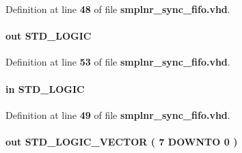 Definition at line {\bf 48} of file {\bf smplnr\+\_\+sync\+\_\+fifo.\+vhd}.

\paragraph[{rdempty}]{ {\bfseries \textcolor{keywordflow}{out}\textcolor{vhdlchar}{ }} {\bfseries \textcolor{comment}{S\+T\+D\+\_\+\+L\+O\+G\+IC}\textcolor{vhdlchar}{ }} \hspace{0.3cm}{\ttfamily [Port]}}\label{classsmplnr__sync__fifo_afc6d6b8085df7af6f9c5d7dc39b1157c}


Definition at line {\bf 53} of file {\bf smplnr\+\_\+sync\+\_\+fifo.\+vhd}.

\paragraph[{rdreq}]{ {\bfseries \textcolor{keywordflow}{in}\textcolor{vhdlchar}{ }} {\bfseries \textcolor{comment}{S\+T\+D\+\_\+\+L\+O\+G\+IC}\textcolor{vhdlchar}{ }} \hspace{0.3cm}{\ttfamily [Port]}}\label{classsmplnr__sync__fifo_a5b72a180053ffc44309f7598bb6ad9e4}


Definition at line {\bf 49} of file {\bf smplnr\+\_\+sync\+\_\+fifo.\+vhd}.

\paragraph[{rdusedw}]{ {\bfseries \textcolor{keywordflow}{out}\textcolor{vhdlchar}{ }} {\bfseries \textcolor{comment}{S\+T\+D\+\_\+\+L\+O\+G\+I\+C\+\_\+\+V\+E\+C\+T\+OR}\textcolor{vhdlchar}{ }\textcolor{vhdlchar}{(}\textcolor{vhdlchar}{ }\textcolor{vhdlchar}{ } \textcolor{vhdldigit}{7} \textcolor{vhdlchar}{ }\textcolor{keywordflow}{D\+O\+W\+N\+TO}\textcolor{vhdlchar}{ }\textcolor{vhdlchar}{ } \textcolor{vhdldigit}{0} \textcolor{vhdlchar}{ }\textcolor{vhdlchar}{)}\textcolor{vhdlchar}{ }} \hspace{0.3cm}{\ttfamily [Port]}}\label{classsmplnr__sync__fifo_ab6b31b92ae71b1513b6cb4e68f5d25a7}


